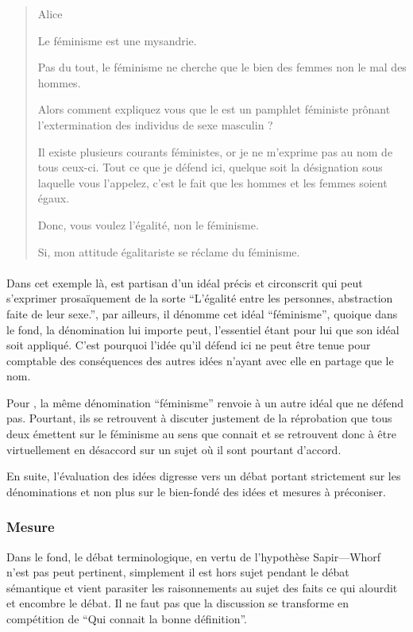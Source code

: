 \begin{quote}
  \begin{drama}{0cm}{0cm}{Alice}

    \Aspeaks Le féminisme est une mysandrie.

    \Bspeaks Pas du tout, le féminisme ne cherche que le bien des femmes non le mal des hommes.

    \Aspeaks Alors comment expliquez vous que le  est un pamphlet féministe prônant l’extermination des individus de sexe masculin ?

    \Bspeaks Il existe plusieurs courants féministes, or je ne m’exprime pas au nom de tous ceux-ci. Tout ce que je défend ici, quelque soit la désignation sous laquelle vous l’appelez, c’est le fait que les hommes et les femmes soient égaux.

    \Aspeaks Donc, vous voulez l’égalité, non le féminisme.

    \Bspeaks Si, mon attitude égalitariste se réclame du féminisme.

  \end{drama}
\end{quote}

\paragraph{}
Dans cet exemple là, \B est partisan d’un idéal précis et circonscrit qui peut s’exprimer prosaïquement de la sorte \enquote{L’égalité entre les personnes, abstraction faite de leur sexe.}, par ailleurs, il dénomme cet idéal \enquote{féminisme}, quoique dans le fond, la dénomination lui importe peut, l’essentiel étant pour lui que son idéal soit appliqué.
C’est pourquoi l’idée qu’il défend ici ne peut être tenue pour comptable des conséquences des autres idées n’ayant avec elle en partage que le nom.

Pour \A, la même dénomination \enquote{féminisme} renvoie à un autre idéal que \B ne défend pas. Pourtant, ils se retrouvent à discuter justement de la réprobation que tous deux émettent sur le féminisme au sens que connait \A et se retrouvent donc à être virtuellement en désaccord sur un sujet où il sont pourtant d’accord.

En suite, l’évaluation des idées digresse vers un débat portant strictement sur les dénominations et non plus sur le bien-fondé des idées et mesures à préconiser.


\subsubsection{Mesure}
Dans le fond, le débat terminologique, en vertu de l’hypothèse Sapir—Whorf n’est pas peut pertinent, simplement il est hors sujet pendant le débat sémantique et vient parasiter les raisonnements au sujet des faits ce qui alourdit et encombre le débat. Il ne faut pas que la discussion se transforme en compétition de \enquote{Qui connait la bonne définition}.

